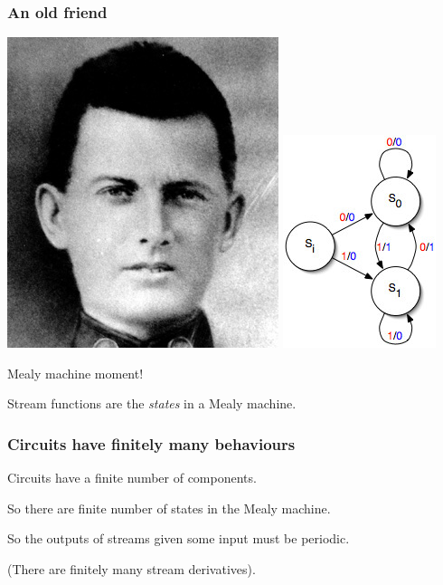 \begin{frame}
    \frametitle{An old friend}

    \Large

    \begin{center}
        \includegraphics[scale=0.33]{imgs/mealy}
        \quad
        \includegraphics[scale=0.5]{imgs/mealy-machine}

        Mealy machine moment!

        \wait

        \normalsize
        Stream functions are the \emph{states} in a Mealy machine.
    \end{center}

\end{frame}
\begin{frame}
    \frametitle{Circuits have finitely many behaviours}

    Circuits have a finite number of components.

    \wait

    So there are finite number of states in the Mealy machine.

    \wait

    So the outputs of streams given some input must be \alert{periodic}.

    \wait

    (There are finitely many \alert{stream derivatives}).
\end{frame}
